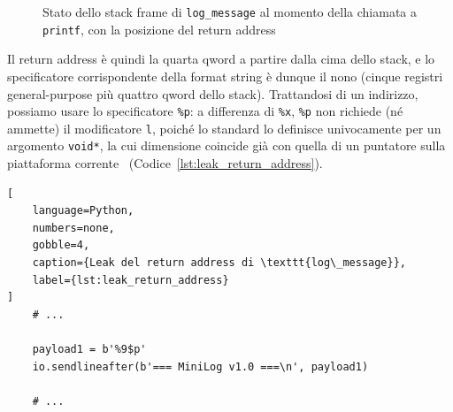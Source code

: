 \begin{figure}[ht]
    \centering
    \caption{Stato dello stack frame di \texttt{log\_message} al momento della chiamata a \texttt{printf}, con la posizione del return address}
    \label{fig:stack_log_message}
\end{figure}

Il return address è quindi la quarta qword a partire dalla cima dello stack, e lo specificatore corrispondente della format string è dunque il nono (cinque registri general-purpose più quattro qword dello stack). Trattandosi di un indirizzo, possiamo usare lo specificatore \texttt{\%p}: a differenza di \texttt{\%x}, \texttt{\%p} non richiede (né ammette) il modificatore \texttt{l}, poiché lo standard lo definisce univocamente per un argomento \texttt{void*}, la cui dimensione coincide già con quella di un puntatore sulla piattaforma corrente~\cite{man3printf} (Codice~\ref{lst:leak_return_address}).
\begin{lstlisting}[
    language=Python,
    numbers=none,
    gobble=4,
    caption={Leak del return address di \texttt{log\_message}},
    label={lst:leak_return_address}
]
    # ...

    payload1 = b'%9$p'
    io.sendlineafter(b'=== MiniLog v1.0 ===\n', payload1)

    # ...
\end{lstlisting}

